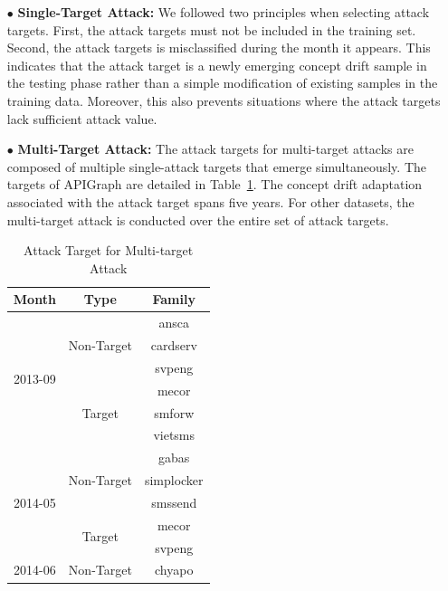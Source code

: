 \begin{itemize}[leftmargin=*]
	
	\item[$\bullet$] \textbf{Single-Target Attack:} 
	We followed two principles when selecting attack targets.
	First, the attack targets must not be included in the training set.
	Second, the attack targets is misclassified during the month it appears.
	This indicates that the attack target is a newly emerging concept drift sample in the testing phase rather than a simple modification of existing samples in the training data.
	Moreover, this also prevents situations where the attack targets lack sufficient attack value.
	
	\item[$\bullet$] \textbf{Multi-Target Attack:} 
	The attack targets for multi-target attacks are composed of multiple single-attack targets that emerge simultaneously.
	The targets of APIGraph are detailed in Table~\ref{tab: Attack Target for Multi-target Attack}.
	The concept drift adaptation associated with the attack target spans five years.
	For other datasets, the multi-target attack is conducted over the entire set of attack targets.
	\begin{table}[ht!]
		\begin{center}
			\caption{Attack Target for Multi-target Attack} %
			\label{tab: Attack Target for Multi-target Attack} %
			\renewcommand{\arraystretch}{0.8}  %
			\begin{tabular}{ccc} %
				\toprule
				\textbf{Month} & \textbf{Type} & \textbf{Family} \\
				\midrule
				\multirow{6}{*}{2013-09} & \multirow{3}{*}{Non-Target} 	& ansca \\ 
				&	& cardserv \\ 
				&	& svpeng  \\ \cline{2-3}
				& \multirow{3}{*}{Target} 	& mecor  \\
				&	& smforw \\
				&	& vietsms \\
				\midrule
				\multirow{5}{*}{2014-05} & \multirow{3}{*}{Non-Target} 	& gabas \\ 
				&	& simplocker \\ 
				&	& smssend \\ \cline{2-3}
				& \multirow{2}{*}{Target} 	& mecor  \\
				&	& svpeng  \\ 
				\midrule
				\multirow{6}{*}{2014-06} & \multirow{4}{*}{Non-Target} 	& chyapo \\ 

\end{tabular}
\end{center}
\end{table}
\end{itemize}
